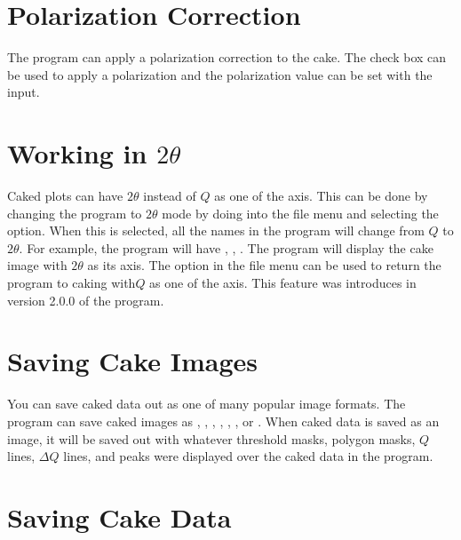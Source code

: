 \section{Polarization Correction}
The program can apply a polarization correction to the
cake. The  check box
can be used to apply a polarization and the 
polarization value can be set with the  input.

\section{\texorpdfstring{Working in $2\theta$}{Working in 2theta}}

Caked plots can have $2\theta$ instead of $Q$ as one
of the axis.  This can be done by changing the program
to $2\theta$ mode by doing into the file menu and selecting 
the  option. When this is selected,
all the names in the program will change from $Q$ to $2\theta$. 
For example, the program will have , , . 
The program will display the cake image with
$2\theta$ as its axis. The  option in the
file menu can be used to return the program to caking with$Q$
as one of the axis. This feature was introduces in version 2.0.0 
of the program.


\section{Saving Cake Images}

You can save caked data out as one of many popular image formats.
The program can save caked images as , , , 
, , , or .  When caked data is 
saved as an image, it will be saved out with whatever threshold masks,
polygon masks, $Q$ lines, $\Delta Q$ lines, and peaks were displayed 
over the caked data in the program.

\section{Saving Cake Data}

